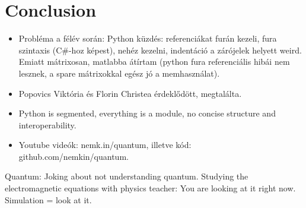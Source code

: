 \chapter{Conclusion}

\begin{itemize}
    \item Probléma a félév során: Python küzdés: referenciákat furán kezeli, fura szintaxis (C\#-hoz képest), nehéz kezelni, indentáció a zárójelek helyett weird. Emiatt mátrixosan, matlabba átírtam (python fura referenciális hibái nem lesznek, a spare mátrixokkal egész jó a memhasználat).
    \item Popovics Viktória és Florin Christea érdeklődött, megtalálta.
    \item Python is segmented, everything is a module, no concise structure and interoperability.
    \item Youtube videók: nemk.in/quantum, illetve kód: github.com/nemkin/quantum.
\end{itemize}

Quantum: Joking about not understanding quantum. Studying the electromagnetic equations with physics teacher: You are looking at it right now. Simulation = look at it.